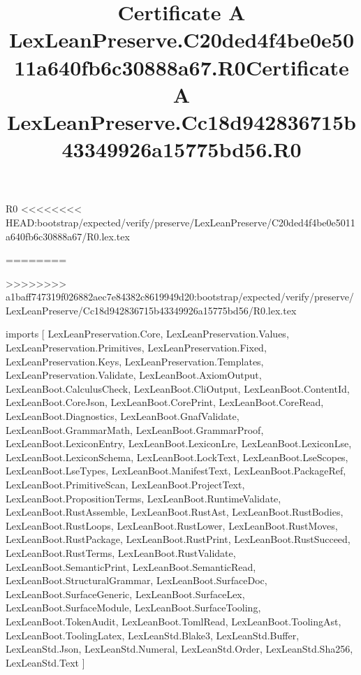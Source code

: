 \begin{lexlean}{R0}
<<<<<<<< HEAD:bootstrap/expected/verify/preserve/LexLeanPreserve/C20ded4f4be0e5011a640fb6c30888a67/R0.lex.tex
\title{Certificate A LexLeanPreserve.C20ded4f4be0e5011a640fb6c30888a67.R0}
========
\title{Certificate A LexLeanPreserve.Cc18d942836715b43349926a15775bd56.R0}
>>>>>>>> a1baff747319f026882aec7e84382c8619949d20:bootstrap/expected/verify/preserve/LexLeanPreserve/Cc18d942836715b43349926a15775bd56/R0.lex.tex
\begin{coremodule}
imports [
  LexLeanPreservation.Core,
  LexLeanPreservation.Values,
  LexLeanPreservation.Primitives,
  LexLeanPreservation.Fixed,
  LexLeanPreservation.Keys,
  LexLeanPreservation.Templates,
  LexLeanPreservation.Validate,
  LexLeanBoot.AxiomOutput,
  LexLeanBoot.CalculusCheck,
  LexLeanBoot.CliOutput,
  LexLeanBoot.ContentId,
  LexLeanBoot.CoreJson,
  LexLeanBoot.CorePrint,
  LexLeanBoot.CoreRead,
  LexLeanBoot.Diagnostics,
  LexLeanBoot.GnafValidate,
  LexLeanBoot.GrammarMath,
  LexLeanBoot.GrammarProof,
  LexLeanBoot.LexiconEntry,
  LexLeanBoot.LexiconLre,
  LexLeanBoot.LexiconLse,
  LexLeanBoot.LexiconSchema,
  LexLeanBoot.LockText,
  LexLeanBoot.LseScopes,
  LexLeanBoot.LseTypes,
  LexLeanBoot.ManifestText,
  LexLeanBoot.PackageRef,
  LexLeanBoot.PrimitiveScan,
  LexLeanBoot.ProjectText,
  LexLeanBoot.PropositionTerms,
  LexLeanBoot.RuntimeValidate,
  LexLeanBoot.RustAssemble,
  LexLeanBoot.RustAst,
  LexLeanBoot.RustBodies,
  LexLeanBoot.RustLoops,
  LexLeanBoot.RustLower,
  LexLeanBoot.RustMoves,
  LexLeanBoot.RustPackage,
  LexLeanBoot.RustPrint,
  LexLeanBoot.RustSucceed,
  LexLeanBoot.RustTerms,
  LexLeanBoot.RustValidate,
  LexLeanBoot.SemanticPrint,
  LexLeanBoot.SemanticRead,
  LexLeanBoot.StructuralGrammar,
  LexLeanBoot.SurfaceDoc,
  LexLeanBoot.SurfaceGeneric,
  LexLeanBoot.SurfaceLex,
  LexLeanBoot.SurfaceModule,
  LexLeanBoot.SurfaceTooling,
  LexLeanBoot.TokenAudit,
  LexLeanBoot.TomlRead,
  LexLeanBoot.ToolingAst,
  LexLeanBoot.ToolingLatex,
  LexLeanStd.Blake3,
  LexLeanStd.Buffer,
  LexLeanStd.Json,
  LexLeanStd.Numeral,
  LexLeanStd.Order,
  LexLeanStd.Sha256,
  LexLeanStd.Text
]


\end{coremodule}
\end{lexlean}
